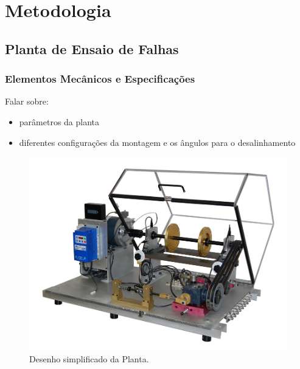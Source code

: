 
\chapter{Metodologia}


% 

\section{Planta de Ensaio de Falhas}



%

\subsection{Elementos Mecânicos e Especificações}


Falar sobre: 
\begin{itemize}
    \item parâmetros da planta
    \item diferentes configurações da montagem e os ângulos para o desalinhamento
\end{itemize}

\begin{figure}[H]
    \caption{Desenho simplificado da Planta.}
    \begin{center}
        \includegraphics[scale=.4]{metodologia/img/real_plant}
    \end{center}
    \label{fig:satelite_completo}
\end{figure}



